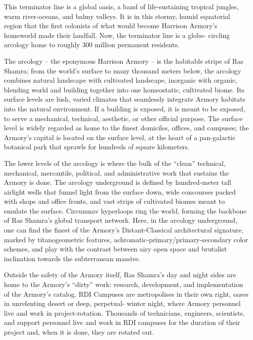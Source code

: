 This terminator line is a global oasis, a band of life-sustaining tropical jungles, warm river-oceans,
and balmy valleys. It is in this stormy, humid equatorial region that the first colonists of what would
become Harrison Armory’s homeworld made their landfall. Now, the terminator line is a globe-
circling arcology home to roughly 300 million permanent residents.

The arcology -- the eponymous Harrison Armory -- is the habitable stripe of Ras Shamra; from the
world’s surface to many thousand meters below, the arcology combines natural landscape with
cultivated landscape, inorganic with organic, blending world and building together into one
homeostatic, cultivated biome. Its surface levels are lush, varied climates that seamlessly
integrate Armory habitats into the natural environment. If a building is exposed, it is meant to be
exposed, to serve a mechanical, technical, aesthetic, or other official purpose. The surface level is
widely regarded as home to the finest domiciles, offices, and campuses; the Armory’s capital is
located on the surface level, at the heart of a pan-galactic botanical park that sprawls for
hundreds of square kilometers.

The lower levels of the arcology is where the bulk of the “clean” technical, mechanical, mercantile,
political, and administrative work that sustains the Armory is done. The arcology underground is
defined by hundred-meter tall airlight wells that funnel light from the surface down, wide
concourses packed with shops and office fronts, and vast strips of cultivated biomes meant to
emulate the surface. Circumnav hyperloops ring the world, forming the backbone of Ras
Shamra’s global transport network. Here, in the arcology underground, one can find the finest of
the Armory’s Distant-Classical architectural signature, marked by titanogeometric features,
achromatic-primary/primary-secondary color schemes, and play with the contrast between airy
open space and brutalist inclination towards the subterranean massive.

Outside the safety of the Armory itself, Ras Shamra’s day and night sides are home to the
Armory’s “dirty” work: research, development, and implementation of the Armory’s catalog. RDI
Campuses are metropolises in their own right, oases in unrelenting desert or deep, perpetual-
winter night, where Armory personnel live and work in project-rotation. Thousands of technicians,
engineers, scientists, and support personnel live and work in RDI campuses for the duration of
their project and, when it is done, they are rotated out.




